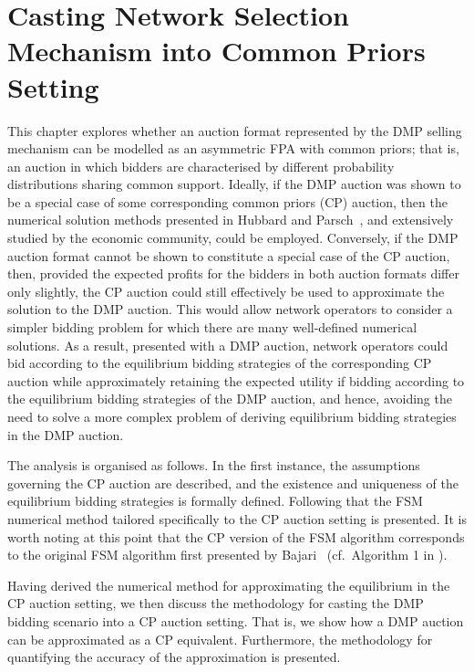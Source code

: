 \chapter{Casting Network Selection Mechanism into Common Priors Setting}
\label{cha:approximation}

\minitoc
\vspace{10mm}

This chapter explores whether an auction format represented by the DMP selling mechanism can be modelled as an asymmetric FPA with common priors; that is, an auction in which bidders are characterised by different probability distributions sharing common support. Ideally, if the DMP auction was shown to be a special case of some corresponding common priors (CP) auction, then the numerical solution methods presented in Hubbard and Parsch~\cite{HubbardPaarsch2011}, and extensively studied by the economic community, could be employed. Conversely, if the DMP auction format cannot be shown to constitute a special case of the CP auction, then, provided the expected profits for the bidders in both auction formats differ only slightly, the CP auction could still effectively be used to approximate the solution to the DMP auction. This would allow network operators to consider a simpler bidding problem for which there are many well-defined numerical solutions. As a result, presented with a DMP auction, network operators could bid according to the equilibrium bidding strategies of the corresponding CP auction while approximately retaining the expected utility if bidding according to the equilibrium bidding strategies of the DMP auction, and hence, avoiding the need to solve a more complex problem of deriving equilibrium bidding strategies in the DMP auction.

The analysis is organised as follows. In the first instance, the assumptions governing the CP auction are described, and the existence and uniqueness of the equilibrium bidding strategies is formally defined. Following that the FSM numerical method tailored specifically to the CP auction setting is presented. It is worth noting at this point that the CP version of the FSM algorithm corresponds to the original FSM algorithm first presented by Bajari~\cite{Bajari2001a} (cf.~Algorithm 1 in \cite{Bajari2001a}).

Having derived the numerical method for approximating the equilibrium in the CP auction setting, we then discuss the methodology for casting the DMP bidding scenario into a CP auction setting. That is, we show how a DMP auction can be approximated as a CP equivalent. Furthermore, the methodology for quantifying the accuracy of the approximation is presented.

